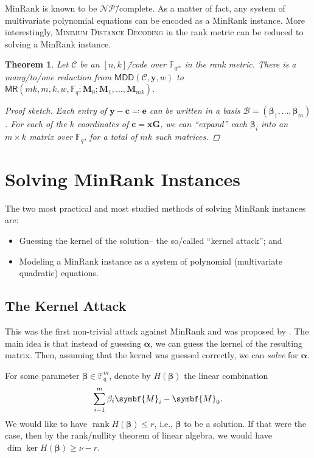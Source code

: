 \documentclass[version=last, paper=A4, parskip=half, oneside,%
toc=bibliography, toc=listof, listof=leveldown]{scrbook}
\theoremstyle{plain}
\newtheorem{theorem}{Theorem}
\theoremstyle{definition}
\theoremstyle{remark}
\renewcommand*{\vec}{\symbf}
\newcommand*{\mat}{\symbf}
\DeclareMathOperator{\rank}{rank}
\newcommand*{\FF}{\ensuremath{\mathbb{F}}}
\newcommand*{\NP}{\ensuremath{\mathcal{NP}}}
\newcommand*{\MDD}{\ensuremath{\mathsf{MDD}}}
\newcommand*{\MR}{\ensuremath{\mathsf{MR}}}
\begin{document}
MinRank is known to be \NP\=/complete.  As a matter of fact, any system of
multivariate polynomial equations can be encoded as a MinRank instance.  More
interestingly, \textsc{Minimum Distance Decoding} in the rank metric can be
reduced to solving a MinRank instance.

\begin{theorem}\label{thm:RD-to-MR}
  Let \(\mathcal{C}\) be an \([n, k]\)\=/code over \(\FF_{q^m}\) in the rank
  metric.  There is a many\-/to\-/one reduction from
  \(\MDD(\mathcal{C}, \vec{y}, w)\) to
  \(\MR(m k, m, k, w, \FF_q; \mat{M}_0; \mat{M}_1, \ldots, \mat{M}_{m k})\).
  \begin{proof}[Proof sketch]
    Each entry of \(\vec{y} - \vec{c} \eqqcolon \vec{e}\) can be written in a
    basis \(\mathcal{B} = (\vec{\beta}_1, \ldots, \vec{\beta}_m)\).  For each of
    the \(k\) coordinates of \(\vec{c} = \vec{x} \mat{G}\), we can
    \enquote{expand} each \(\vec{\beta}_i\) into an \(m \times k\) matrix over
    \(\FF_q\), for a total of \(m k\) such matrices.
  \end{proof}
\end{theorem}

\section{Solving MinRank Instances}\label{sec:MR-attacks}

The two most practical and most studied methods of solving MinRank instances
are:
\begin{itemize}
\item Guessing the kernel of the solution\--- the so\-/called \enquote{kernel
    attack}; and
\item Modeling a MinRank instance as a system of polynomial (multivariate
  quadratic) equations.
\end{itemize}

\subsection{The Kernel Attack}\label{sec:kernel-attack}

This was the first non-trivial attack against MinRank and was proposed by
\textcite{GC00}.  The main idea is that instead of guessing \(\vec{\alpha}\), we
can guess the kernel of the resulting matrix.  Then, assuming that the kernel
was guessed correctly, we can \emph{solve} for \(\vec{\alpha}\).

For some parameter \(\vec{\beta} \in \FF_q^m\), denote by \(H(\vec{\beta})\) the
linear combination
\[
  \sum_{i=1}^m \beta_i \mat{M}_i - \mat{M}_0\text.
\]
We would like to have \(\rank H(\vec{\beta}) \le r\), i.e., \(\vec{\beta}\) to
be a solution.  If that were the case, then by the rank\-/nullity theorem of
linear algebra, we would have \(\dim \ker H(\vec{\beta}) \ge \nu - r\).
\end{document}
